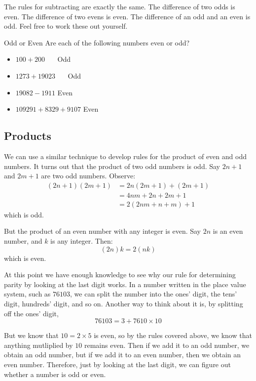 \documentclass[a4paper,10pt]{report}
\begin{document}
The rules for subtracting are exactly the same. The difference of two odds is
even. The difference of two evens is even. The difference of an odd and an even
is odd. Feel free to work these out yourself.

\begin{problem}{Odd or Even}
 Are each of the following numbers even or odd?

 \begin{itemize}
  \item $100 + 200$ \hfill {}~~~Odd
  \item $1273 + 19023$ \hfill {}~~~Odd
  \item $19082 - 1911$ \hfill Even~~~
  \item $109291 + 8329 + 9107$ \hfill Even~~~
 \end{itemize}
\end{problem}

\subsection{Products}

We can use a similar technique to develop rules for the product of even and odd
numbers. It turns out that the product of two odd numbers is odd. Say $2n+1$
and $2m+1$ are two odd numbers. Observe: \begin{align*}
 (2n+1)(2m+1)
 &= 2n(2m+1) + (2m+1) \\
 &= 4nm+2n+2m+1 \\
 &= 2(2nm+n+m) + 1
\end{align*} which is odd.

But the product of an even number with any integer is even. Say $2n$ is an
even number, and $k$ is any integer. Then: \[
 (2n)k = 2(nk)
\] which is even.

At this point we have enough knowledge to see why our rule for determining
parity by looking at the last digit works. In a number written in the place
value system, such as $76103$, we can split the number into the ones' digit,
the tens' digit, hundreds' digit, and so on. Another way to think about it is,
by splitting off the ones' digit, \[
 76103 = 3 + 7610 \times 10
\]

But we know that $10=2\times5$ is even, so by the rules covered above, we know
that anything mutliplied by $10$ remains even. Then if we add it to an odd
number, we obtain an odd number, but if we add it to an even number, then we
obtain an even number. Therefore, just by looking at the last digit, we can
figure out whether a number is odd or even.
\end{document}
